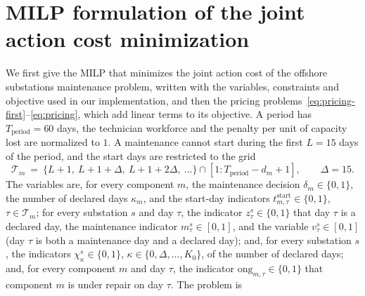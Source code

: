 \documentclass{article}
\begin{document}
\section{MILP formulation of the joint action cost minimization}
\label{app:maintenance-problem}

We first give the MILP that minimizes the joint action cost of the offshore substations maintenance problem, written
with the variables, constraints and objective used in our implementation, and then the pricing
problems~\eqref{eq:pricing-first}--\eqref{eq:pricing}, which add linear terms to its objective. A period has
$T_{\mathrm{period}} = 60$ days, the technician workforce and the penalty per unit of capacity lost are normalized to
$1$. A maintenance cannot start during the first $L = 15$ days of the period, and the start days are
restricted to the grid
\[
\mathcal{T}_m \ =\ \{L+1,\ L+1+\Delta,\ L+1+2\Delta,\ \ldots\} \cap [1 : T_{\mathrm{period}} - d_m + 1],
\qquad \Delta = 15.
\]
The variables are, for every component $m$, the maintenance decision $\delta_m \in \{0,1\}$, the number of declared days $\kappa_m$, and the start-day indicators $t^{\mathrm{start}}_{m,\tau} \in \{0,1\}$,
$\tau \in \mathcal{T}_m$; for every substation $s$ and day $\tau$, the indicator $z^s_\tau \in \{0,1\}$ that day $\tau$
is a declared day, the maintenance indicator $m^s_\tau \in [0,1]$, and the variable $v^s_\tau \in [0,1]$
(day $\tau$ is both a maintenance day and a declared day); and, for every substation $s$, the indicators
$\chi^s_\kappa \in \{0,1\}$, $\kappa \in \{0, \Delta, \ldots, K_0\}$, of the number of declared days; and, for every component $m$ and day $\tau$, the indicator $\mathrm{ong}_{m,\tau} \in \{0,1\}$ that
component $m$ is under repair on day $\tau$. The problem is
\end{document}
